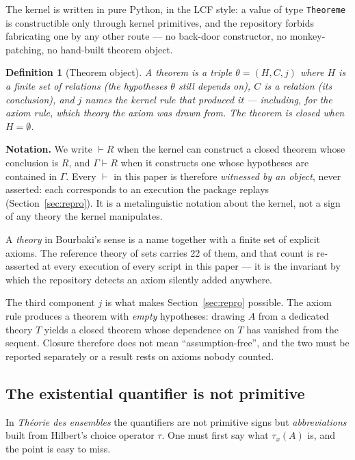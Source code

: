 \documentclass[11pt]{article}
\newtheorem{definition}{Definition}
\theoremstyle{remark}\newtheorem{remark}{Remark}
\begin{document}
The kernel is written in pure Python, in the LCF style: a value of type
\texttt{Theoreme} is constructible only through kernel primitives, and the repository
forbids fabricating one by any other route --- no back-door constructor, no
monkey-patching, no hand-built theorem object.

\begin{definition}[Theorem object]\label{def:theoreme}
A \emph{theorem} is a triple $\theta = (H, C, j)$ where $H$ is a finite set of
relations (the \emph{hypotheses} $\theta$ still depends on), $C$ is a relation (its
\emph{conclusion}), and $j$ names the kernel rule that produced it --- including, for
the axiom rule, \emph{which theory the axiom was drawn from}. The theorem is
\emph{closed} when $H = \emptyset$.
\end{definition}

\noindent
\textbf{Notation.} We write $\vdash R$ when the kernel can construct a closed theorem
whose conclusion is $R$, and $\Gamma \vdash R$ when it constructs one whose hypotheses
are contained in $\Gamma$. Every $\vdash$ in this paper is therefore \emph{witnessed by
an object}, never asserted: each corresponds to an execution the package replays
(Section~\ref{sec:repro}). It is a metalinguistic notation about the kernel, not a sign
of any theory the kernel manipulates.

A \emph{theory} in Bourbaki's sense is a name together with a finite set of explicit
axioms. The reference theory of sets carries 22 of them, and that count is re-asserted
at every execution of every script in this paper --- it is the invariant by which the
repository detects an axiom silently added anywhere.

The third component $j$ is what makes Section~\ref{sec:repro} possible. The axiom rule
produces a theorem with \emph{empty} hypotheses: drawing $A$ from a dedicated theory
$T$ yields a closed theorem whose dependence on $T$ has vanished from the sequent.
Closure therefore does not mean ``assumption-free'', and the two must be reported
separately or a result rests on axioms nobody counted.

\subsection{The existential quantifier is not primitive}

In \emph{Th\'eorie des ensembles} the quantifiers are not primitive signs but
\emph{abbreviations} built from Hilbert's choice operator $\tau$. One must first say
what $\tau_x(A)$ is, and the point is easy to miss.
\end{document}
